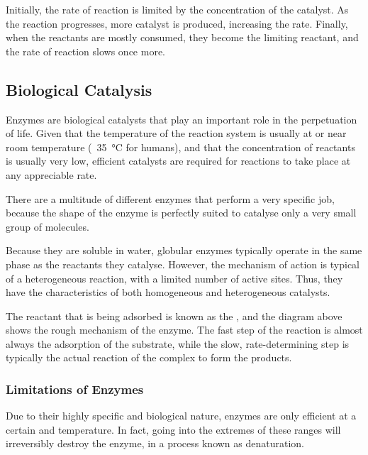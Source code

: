 			Initially, the rate of reaction is limited by the concentration of the catalyst. As the reaction progresses, more catalyst
			is produced, increasing the rate. Finally, when the reactants are mostly consumed, they become the limiting reactant, and the
			rate of reaction slows once more.



		\pagebreak
		\subsection{Biological Catalysis}
			Enzymes are biological catalysts that play an important role in the perpetuation of life. Given that the temperature of the
			reaction system is usually at or near room temperature (~\SI{35}{\celsius} for humans), and that the concentration of reactants
			is usually very low, efficient catalysts are required for reactions to take place at any appreciable rate.

			There are a multitude of different enzymes that perform a very specific job, because the shape of the enzyme is perfectly suited
			to catalyse only a very small group of molecules.

			Because they are soluble in water, globular enzymes typically operate in the same phase as the reactants they catalyse. However, the
			mechanism of action is typical of a heterogeneous reaction, with a limited number of active sites. Thus, they have the characteristics
			of both homogeneous and heterogeneous catalysts.


			The reactant that is being adsorbed is known as the , and the diagram above shows the rough mechanism of the
			enzyme. The fast step of the reaction is almost always the adsorption of the substrate, while the slow, rate-determining step is
			typically the actual reaction of the complex to form the products.


			\subsubsection{Limitations of Enzymes}

				Due to their highly specific and biological nature, enzymes are only efficient at a certain \pH and temperature. In fact,
				going into the extremes of these ranges will irreversibly destroy the enzyme, in a process known as denaturation.

